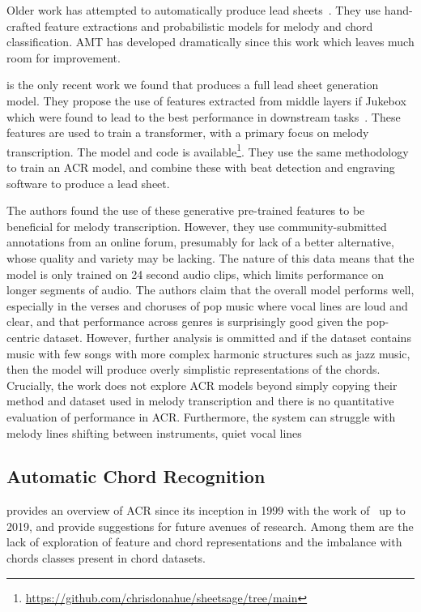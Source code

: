 Older work has attempted to automatically produce lead sheets~\citep{LeadSheet2008,LeadSheet2009}. They use hand-crafted feature extractions and probabilistic models for melody and chord classification. AMT has developed dramatically since this work which leaves much room for improvement.

\citep{MelodyTranscriptionViaGenerativePreTraining} is the only recent work we found that produces a full lead sheet generation model. They propose the use of features extracted from middle layers if Jukebox~\citep{Jukebox} which were found to lead to the best performance in downstream tasks~\citep{JukeBoxFeatureExtraction}. These features are used to train a transformer, with a primary focus on melody transcription. The model and code is available\footnote{\url{https://github.com/chrisdonahue/sheetsage/tree/main}}. They use the same methodology to train an ACR model, and combine these with beat detection and engraving software to produce a lead sheet.

The authors found the use of these generative pre-trained features to be beneficial for melody transcription. However, they use community-submitted annotations from an online forum, presumably for lack of a better alternative, whose quality and variety may be lacking. The nature of this data means that the model is only trained on 24 second audio clips, which limits performance on longer segments of audio. The authors claim that the overall model performs well, especially in the verses and choruses of pop music where vocal lines are loud and clear, and that performance across genres is surprisingly good given the pop-centric dataset. However, further analysis is ommitted and if the dataset contains music with few songs with more complex harmonic structures such as jazz music, then the model will produce overly simplistic representations of the chords. Crucially, the work does not explore ACR models beyond simply copying their method and dataset used in melody transcription and there is no quantitative evaluation of performance in ACR. Furthermore, the system can struggle with melody lines shifting between instruments, quiet vocal lines

\subsection{Automatic Chord Recognition}\label{sec:background-acr}

\cite{20YearsofACR} provides an overview of ACR since its inception in 1999 with the work of~\citet{FujishimaACR} up to 2019, and provide suggestions for future avenues of research. Among them are the lack of exploration of feature and chord representations and the imbalance with chords classes present in chord datasets.

